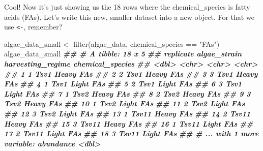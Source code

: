 \documentclass[
]{krantz}
\newenvironment{Shaded}{\begin{snugshade}}{\end{snugshade}}
\newcommand{\DocumentationTok}[1]{\textcolor[rgb]{0.56,0.35,0.01}{\textbf{\textit{#1}}}}
\newcommand{\FunctionTok}[1]{\textcolor[rgb]{0.00,0.00,0.00}{#1}}
\newcommand{\NormalTok}[1]{#1}
\newcommand{\OtherTok}[1]{\textcolor[rgb]{0.56,0.35,0.01}{#1}}
\newcommand{\SpecialCharTok}[1]{\textcolor[rgb]{0.00,0.00,0.00}{#1}}
\newcommand{\StringTok}[1]{\textcolor[rgb]{0.31,0.60,0.02}{#1}}
\begin{document}
Cool! Now it's just showing us the 18 rows where the chemical\_species is fatty acids (FAs). Let's write this new, smaller dataset into a new object. For that we use \texttt{\textless{}-}, remember?

\begin{Shaded}
\begin{Highlighting}[]
\NormalTok{algae\_data\_small }\OtherTok{\textless{}{-}} \FunctionTok{filter}\NormalTok{(algae\_data, chemical\_species }\SpecialCharTok{==} \StringTok{"FAs"}\NormalTok{)}
\NormalTok{algae\_data\_small}
\DocumentationTok{\#\# \# A tibble: 18 x 5}
\DocumentationTok{\#\#    replicate algae\_strain harvesting\_regime chemical\_species}
\DocumentationTok{\#\#        \textless{}dbl\textgreater{} \textless{}chr\textgreater{}        \textless{}chr\textgreater{}             \textless{}chr\textgreater{}           }
\DocumentationTok{\#\#  1         1 Tsv1         Heavy             FAs             }
\DocumentationTok{\#\#  2         2 Tsv1         Heavy             FAs             }
\DocumentationTok{\#\#  3         3 Tsv1         Heavy             FAs             }
\DocumentationTok{\#\#  4         1 Tsv1         Light             FAs             }
\DocumentationTok{\#\#  5         2 Tsv1         Light             FAs             }
\DocumentationTok{\#\#  6         3 Tsv1         Light             FAs             }
\DocumentationTok{\#\#  7         1 Tsv2         Heavy             FAs             }
\DocumentationTok{\#\#  8         2 Tsv2         Heavy             FAs             }
\DocumentationTok{\#\#  9         3 Tsv2         Heavy             FAs             }
\DocumentationTok{\#\# 10         1 Tsv2         Light             FAs             }
\DocumentationTok{\#\# 11         2 Tsv2         Light             FAs             }
\DocumentationTok{\#\# 12         3 Tsv2         Light             FAs             }
\DocumentationTok{\#\# 13         1 Tsv11        Heavy             FAs             }
\DocumentationTok{\#\# 14         2 Tsv11        Heavy             FAs             }
\DocumentationTok{\#\# 15         3 Tsv11        Heavy             FAs             }
\DocumentationTok{\#\# 16         1 Tsv11        Light             FAs             }
\DocumentationTok{\#\# 17         2 Tsv11        Light             FAs             }
\DocumentationTok{\#\# 18         3 Tsv11        Light             FAs             }
\DocumentationTok{\#\# \# ... with 1 more variable: abundance \textless{}dbl\textgreater{}}
\end{Highlighting}
\end{Shaded}
\end{document}
